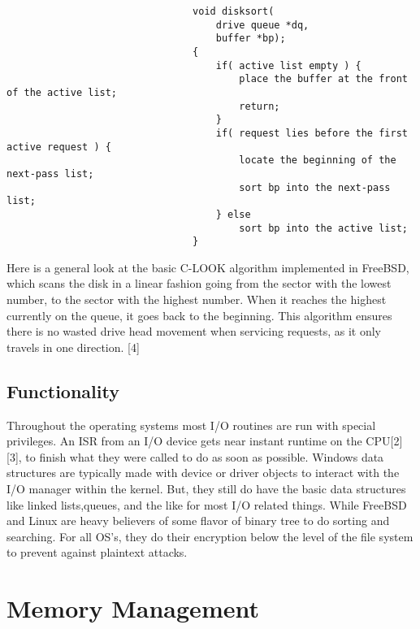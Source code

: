 \documentclass{article}
\begin{document}
                                	\begin{lstlisting}
                                void disksort(
                                	drive queue *dq,
                                	buffer *bp);
                                {
                                	if( active list empty ) {
                                		place the buffer at the front of the active list;
                                		return;
                                	}
                                	if( request lies before the first active request ) {
                                		locate the beginning of the next-pass list;
                                		sort bp into the next-pass list;
                                	} else
                                		sort bp into the active list;
                                }
                                \end{lstlisting}
                                Here is a general look at the basic C-LOOK algorithm implemented in FreeBSD, which scans the disk in a linear fashion going from the sector with the lowest number, to the sector with the highest number. When it reaches the highest currently on the queue, it goes back to the beginning. This algorithm ensures there is no wasted drive head movement when servicing requests, as it only travels in one direction. [4]


\subsection{Functionality}
	Throughout the operating systems most I/O routines are run with special privileges. An ISR from an I/O device gets near instant runtime on the CPU[2][3], to finish what they were called to do as soon as possible. Windows data structures are typically made with device or driver objects to interact with the I/O manager within the kernel. But, they still do have the basic data structures like linked lists,queues, and the like for most I/O related things. While FreeBSD and Linux are heavy believers of some flavor of binary tree to do sorting and searching.  For all OS’s, they do their encryption below the level of the file system to prevent against plaintext attacks.
\section{Memory Management}
\end{document}
